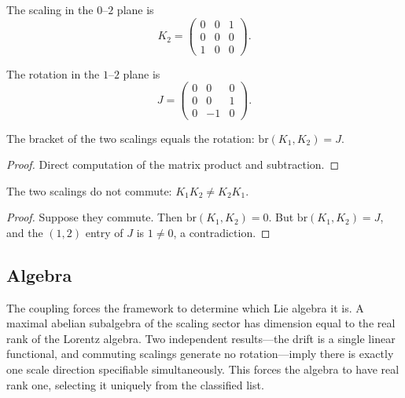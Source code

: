 \begin{definition}
The scaling in the $0$--$2$ plane is
\[K_2 = \begin{pmatrix} 0 & 0 & 1 \\ 0 & 0 & 0 \\ 1 & 0 & 0 \end{pmatrix}.\]
\end{definition}

\begin{definition}
The rotation in the $1$--$2$ plane is
\[J = \begin{pmatrix} 0 & 0 & 0 \\ 0 & 0 & 1 \\ 0 & -1 & 0 \end{pmatrix}.\]
\end{definition}

\begin{theorem}
The bracket of the two scalings equals the rotation: $\text{br}(K_1, K_2) = J$.
\end{theorem}
\begin{proof}
Direct computation of the matrix product and subtraction.
\end{proof}

\begin{theorem}
The two scalings do not commute: $K_1 K_2 \neq K_2 K_1$.
\end{theorem}
\begin{proof}
Suppose they commute. Then $\text{br}(K_1, K_2) = 0$. But $\text{br}(K_1, K_2) = J$, and the $(1, 2)$ entry of $J$ is $1 \neq 0$, a contradiction.
\end{proof}

\subsection{Algebra}

The coupling forces the framework to determine which Lie algebra it is. A maximal abelian
subalgebra of the scaling sector has dimension equal to the real rank of the Lorentz algebra.
Two independent results—the drift is a single linear functional, and commuting scalings
generate no rotation—imply there is exactly one scale direction specifiable simultaneously.
This forces the algebra to have real rank one, selecting it uniquely from the classified list.

